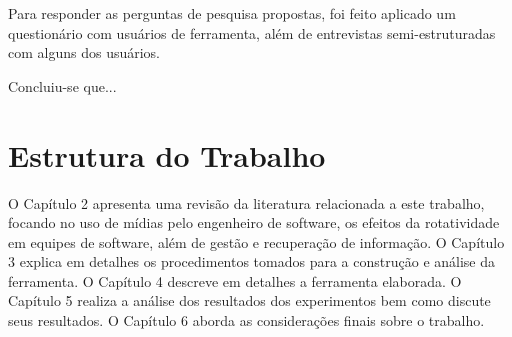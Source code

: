 

Para responder as perguntas de pesquisa propostas, foi feito aplicado um questionário com usuários de ferramenta, além de entrevistas semi-estruturadas com alguns dos usuários.

Concluiu-se que...

\section{Estrutura do Trabalho}

O Capítulo 2 apresenta uma revisão da literatura relacionada a este trabalho, focando no uso de mídias pelo engenheiro de software, os efeitos da rotatividade em equipes de software, além de gestão e recuperação de informação. O Capítulo 3 explica em detalhes os procedimentos tomados para a construção e análise da ferramenta. O Capítulo 4 descreve em detalhes a ferramenta elaborada. O Capítulo 5 realiza a análise dos resultados dos experimentos bem como discute seus resultados. O Capítulo 6 aborda as considerações finais sobre o trabalho.
